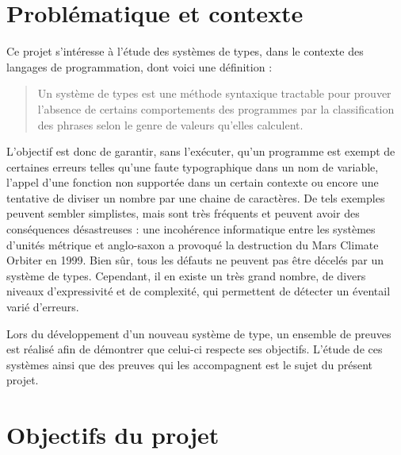\documentclass[a4paper, oneside, 12pt, titlepage]{article}
\begin{document}
\tableofcontents

\cleardoublepage
{}

\section{Problématique et contexte}


Ce projet s'intéresse à l'étude des systèmes de types, dans le contexte des langages de
programmation, dont voici une définition \cite{pierce2002} :

\begin{quotation}
  Un système de types est une méthode syntaxique tractable pour prouver l'absence de certains
  comportements des programmes par la classification des phrases selon le genre de valeurs qu'elles
  calculent.
\end{quotation}

L'objectif est donc de garantir, sans l'exécuter, qu'un programme est exempt de certaines erreurs
telles qu'une faute typographique dans un nom de variable, l'appel d'une fonction non supportée dans
un certain contexte ou encore une tentative de diviser un nombre par une chaine de caractères. De
tels exemples peuvent sembler simplistes, mais sont très fréquents et peuvent avoir des conséquences
désastreuses : une incohérence informatique entre les systèmes d'unités métrique et anglo-saxon a
provoqué la destruction du Mars Climate Orbiter en 1999. Bien sûr, tous les défauts ne peuvent pas
être décelés par un système de types. Cependant, il en existe un très grand nombre, de divers
niveaux d'expressivité et de complexité, qui permettent de détecter un éventail varié d'erreurs.

Lors du développement d'un nouveau système de type, un ensemble de preuves est réalisé afin de
démontrer que celui-ci respecte ses objectifs. L'étude de ces systèmes ainsi que des
preuves qui les accompagnent est le sujet du présent projet.

\section{Objectifs du projet}

\end{document}
